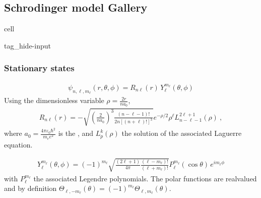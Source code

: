 \documentclass[letterpaper,10pt,english]{jupyterBook}
\begin{document}
\sphinxstepscope


\subsection{Schrodinger model \sphinxhyphen{} Gallery}
\label{\detokenize{ch/quantum-mechanics/atom-models/schrodinger-gallery:schrodinger-model-gallery}}\label{\detokenize{ch/quantum-mechanics/atom-models/schrodinger-gallery:quantum-mechanics-atom-models-schrodinger-gallery}}\label{\detokenize{ch/quantum-mechanics/atom-models/schrodinger-gallery::doc}}
\begin{sphinxuseclass}{cell}
\begin{sphinxuseclass}{tag_hide-input}
\end{sphinxuseclass}
\end{sphinxuseclass}

\subsubsection{Stationary states}
\label{\detokenize{ch/quantum-mechanics/atom-models/schrodinger-gallery:stationary-states}}\label{\detokenize{ch/quantum-mechanics/atom-models/schrodinger-gallery:quantum-mechanics-atom-models-schrodinger-gallery-stationary-states}}\begin{equation*}
\begin{split}\psi_{n,\ell,m_\ell}(r, \theta, \phi) = R_{n\ell}(r) \, Y_\ell^{m_\ell}(\theta, \phi)\end{split}
\end{equation*}
\sphinxAtStartPar
{} Using the dimensionless variable \(\rho = \frac{2r}{n a_0}\),
\begin{equation*}
\begin{split}R_{n\ell}(r) = -\sqrt{\left(\frac{2}{n a_0}\right)^3 \frac{(n-\ell-1)!}{2n [(n+\ell)!]^3}} e^{-\rho/2} \rho^\ell L_{n-\ell-1}^{2\ell+1}(\rho) \ ,\end{split}
\end{equation*}
\sphinxAtStartPar
where \(a_0 = \frac{4\pi \varepsilon_0 \hbar^2}{m_e e^2}\) is the , and \(L^k_p(\rho)\) the solution of the associated Laguerre equation.

\sphinxAtStartPar
{}
\begin{equation*}
\begin{split}Y_\ell^{m_\ell}(\theta, \phi) = (-1)^{m_\ell} \sqrt{\frac{(2\ell+1)}{4\pi} \frac{(\ell-m_\ell)!}{(\ell+m_\ell)!}} P_\ell^{m_\ell}(\cos\theta) \, e^{i m_\ell \phi}\end{split}
\end{equation*}
\sphinxAtStartPar
with \(P^{m_{\ell}}_{\ell}\) the associated Legendre polynomials. The polar functions are real\sphinxhyphen{}valued and by definition \(\Theta_{\ell,-m_\ell}(\theta) = (-1)^{m_\ell} \Theta_{\ell,m_\ell}(\theta)\).
\end{document}

